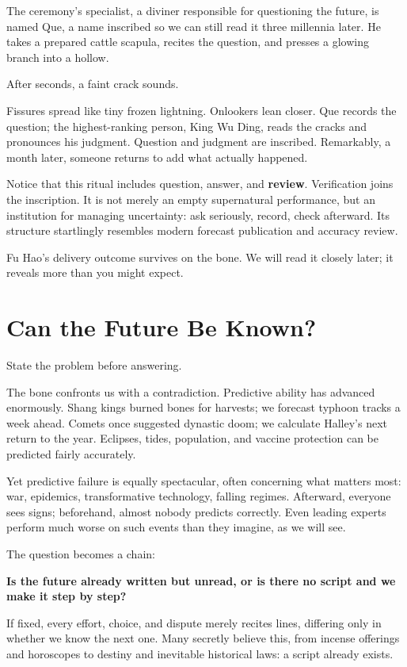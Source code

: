 The ceremony's specialist, a diviner responsible for questioning the future, is named Que, a name inscribed so we can still read it three millennia later. He takes a prepared cattle scapula, recites the question, and presses a glowing branch into a hollow.

After seconds, a faint crack sounds.

Fissures spread like tiny frozen lightning. Onlookers lean closer. Que records the question; the highest-ranking person, King Wu Ding, reads the cracks and pronounces his judgment. Question and judgment are inscribed. Remarkably, a month later, someone returns to add what actually happened.

Notice that this ritual includes question, answer, and \textbf{review}. Verification joins the inscription. It is not merely an empty supernatural performance, but an institution for managing uncertainty: ask seriously, record, check afterward. Its structure startlingly resembles modern forecast publication and accuracy review.

Fu Hao's delivery outcome survives on the bone. We will read it closely later; it reveals more than you might expect.

\section{Can the Future Be Known?}
State the problem before answering.

The bone confronts us with a contradiction. Predictive ability has advanced enormously. Shang kings burned bones for harvests; we forecast typhoon tracks a week ahead. Comets once suggested dynastic doom; we calculate Halley's next return to the year. Eclipses, tides, population, and vaccine protection can be predicted fairly accurately.

Yet predictive failure is equally spectacular, often concerning what matters most: war, epidemics, transformative technology, falling regimes. Afterward, everyone sees signs; beforehand, almost nobody predicts correctly. Even leading experts perform much worse on such events than they imagine, as we will see.

The question becomes a chain:

\textbf{Is the future already written but unread, or is there no script and we make it step by step?}

If fixed, every effort, choice, and dispute merely recites lines, differing only in whether we know the next one. Many secretly believe this, from incense offerings and horoscopes to destiny and inevitable historical laws: a script already exists.

